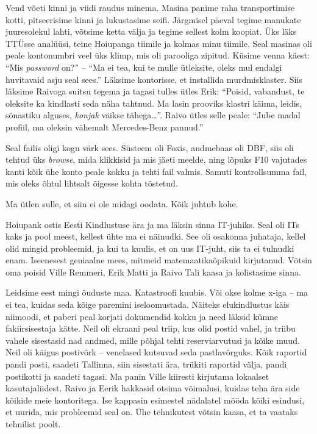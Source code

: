 Vend võeti kinni ja viidi raudus minema. Masina panime raha transportimise kotti, pitseerisime 
kinni ja lukustasime seifi. Järgmisel päeval tegime manukate juuresolekul lahti, võtsime 
ketta välja ja tegime sellest kolm koopiat. Üks läks TTÜsse analüüsi, teine Hoiupanga 
tiimile ja kolmas minu tiimile. Seal masinas oli peale kontonumbri veel üks 
klimp, mis oli parooliga zipitud. Küsime venna käest: \enquote{Mis \emph{password} on?} -- \enquote{Ma ei 
tea, kui te mulle ütleksite, oleks mul endalgi huvitavaid asju seal sees.} 
Läksime kontorisse, et installida murdmisklaster. Siis läksime 
Raivoga suitsu tegema ja tagasi tulles ütles 
Erik: \enquote{Poisid, vabandust, te oleksite ka 
kindlasti seda näha tahtnud. Ma lasin prooviks klastri käima, leidis, sõnastiku alguses, 
\emph{konjak} väikse tähega\ldots}. Raivo ütles selle peale: \enquote{Jube madal 
profiil, ma oleksin vähemalt Mercedes-Benz pannud.} 

Seal failis oligi kogu värk sees. Süsteem oli Foxis, andmebaas oli DBF, siis 
oli tehtud üks \emph{browse}, mida klikkisid ja mis jäeti meelde, ning lõpuks F10 
vajutades kanti kõik ühe konto peale kokku ja tehti fail valmis. Samuti
kontrollsumma fail, mis oleks õhtul lihtsalt õigesse kohta 
tõstetud. 


Ma ütlen sulle, et siin ei ole midagi oodata. Kõik juhtub kohe.

Hoiupank ostis Eesti Kindlustuse ära ja ma läksin sinna IT-juhiks. Seal oli ITs 
kaks ja pool meest, kellest ühte ma ei näinudki. See oli osakonna juhataja, kellel 
olid mingid probleemid, ja kui ta kuulis, et on uus IT-juht, siis ta ei 
tulnudki enam. Iseenesest geniaalne mees, mitmeid matemaatikaõpikuid 
kirjutanud. Võtsin oma poisid Ville 
Remmeri, Erik Matti ja Raivo 
Tali kaasa ja kolistasime sinna. 

Leidsime eest mingi õuduste maa. Katastroofi kuubis. Või okse kolme x-iga -- ma ei tea, kuidas seda kõige paremini
iseloomustada. Näiteks elukindlustus käis niimoodi, et paberi peal korjati dokumendid 
kokku ja need läksid kümne fakiirsisestaja kätte. Neil oli ekraani peal triip, 
kus olid postid vahel, ja triibu vahele sisestasid nad andmed, mille põhjal 
tehti reserviarvutusi ja kõike muud. Neil oli käigus postivõrk -- venelased kutsuvad seda
pastlavõrguks. Kõik raportid pandi posti, 
saadeti Tallinna, siin sisestati ära, trükiti raportid välja, pandi postikotti 
ja saadeti tagasi. Ma panin Ville kiiresti kirjutama lokaalset kasutajaliidest. 
Raivo ja Eerik hakkasid otsima võimalusi, kuidas teha ära side kõikide meie 
kontoritega. Ise kappasin esimestel nädalatel mööda kõiki esindusi, et uurida, mis 
probleemid seal on. Ühe tehnikutest võtsin kaasa, et ta vaataks tehnilist 
poolt. 

